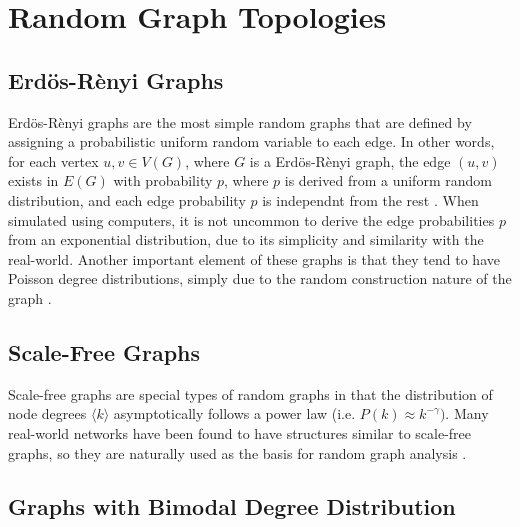 \documentclass[doc]{apa}%
\begin{document}
\section{Random Graph Topologies}


\subsection{Erd\"{o}s-R\`{e}nyi Graphs}
Erd\"{o}s-R\`{e}nyi graphs are the most simple random graphs that are defined by assigning a probabilistic uniform random variable to each edge. In other words, for each vertex $u, v \in V(G)$, where $G$ is a Erd\"{o}s-R\`{e}nyi graph, the edge $(u,v)$ exists in $E(G)$ with probability $p$, where $p$ is derived from a uniform random distribution, and each edge probability $p$ is independnt from the rest \cite{LargeNetworkRobustness-PVM}. When simulated using computers, it is not uncommon to derive the edge probabilities $p$ from an exponential distribution, due to its simplicity and similarity with the real-world. Another important element of these graphs is that they tend to have Poisson degree distributions, simply due to the random construction nature of the graph \cite{bimodal}.


\subsection{Scale-Free Graphs}
Scale-free graphs are special types of random graphs in that the distribution of node degrees $\langle k \rangle$ asymptotically follows a power law (i.e. $P(k) \approx k^{-\gamma})$. Many real-world networks have been found to have structures similar to scale-free graphs, so they are naturally used as the basis for random graph analysis \cite{AttacksWavesRandom}. 


\subsection{Graphs with Bimodal Degree Distribution}
\end{document}
